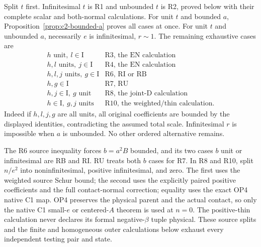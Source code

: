 Split $t$ first. Infinitesimal $t$ is R1 and unbounded $t$ is R2,
proved below with their complete scalar and both-normal calculations.
For unit $t$ and bounded $a$, Proposition~\ref{prop:c2-bounded-a}
proves all cases at once.
For unit $t$ and unbounded $a$, necessarily $e$ is infinitesimal,
$r\sim1$. The remaining exhaustive cases are
\[
\begin{array}{c|l}
 h\text{ unit},\ l\in\mathrm I&\text{R3, the EN calculation}\\
 h,l\text{ units},\ j\in\mathrm I&\text{R4, the EN calculation}\\
 h,l,j\text{ units},\ g\in\mathrm I&\text{R6, RI or RB}\\
 h,g\in\mathrm I&\text{R7, RU}\\
 h,j\in\mathrm I,\ g\text{ unit}&\text{R8, the joint-D calculation}\\
 h\in\mathrm I,\ g,j\text{ units}&\text{R10, the weighted/thin calculation}.
\end{array}
\]
Indeed if $h,l,j,g$ are all units, all original coefficients are
bounded by the displayed identities, contradicting the assumed total
scale. Infinitesimal $r$ is impossible when $a$ is unbounded. No
other ordered alternative remains.

The R6 source inequality forces $b=a^2B$ bounded, and its two cases
$b$ unit or infinitesimal are RB and RI. RU treats both $b$ cases for
R7. In R8 and R10, split $n/e^2$ into noninfinitesimal, positive
infinitesimal, and zero. The first uses the weighted source Schur
bound; the second uses the explicitly paired positive coefficients and
the full contact-normal correction; equality uses the exact OP4
native C1 map. OP4 preserves the physical parent and the actual
contact, so only the native C1 small-$e$ or centered-$A$ theorem is
used at $n=0$. The positive-thin calculation never declares its
formal negative-$\beta$ tuple physical. These source splits and the
finite and homogeneous outer calculations below exhaust every
independent testing pair and state.

